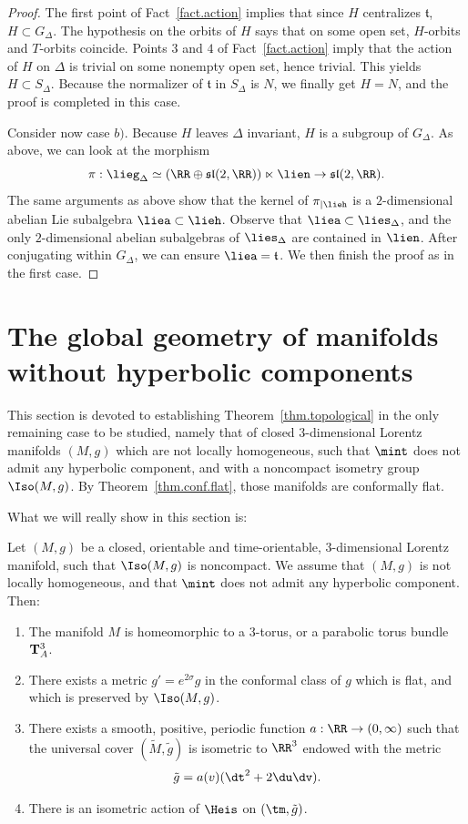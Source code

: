 \begin{proof}
The first point of Fact~\ref{fact.action} implies that since $H$ centralizes $\mathfrak{t}$, $H \subset G_{\Delta}$. The hypothesis on the orbits of $H$ says that on some open set, $H$-orbits and $T$-orbits coincide. Points $3$ and $4$ of Fact~\ref{fact.action} imply that the action of $H$ on $\Delta$ is trivial on some nonempty open set, hence trivial. This yields $H \subset S_{\Delta}$. Because the normalizer of $\mathfrak{t}$ in $S_{\Delta}$ is $N$, we finally get $H=N$, and the proof is completed in this case.



Consider now case $b)$. Because $H$ leaves $\Delta$ invariant, $H$ is a subgroup of $G_{\Delta}$. As above, we can look at the morphism
\[
\pi: \lieg_{\Delta} \simeq (\RR \oplus \mathfrak{sl}(2,\RR)) \ltimes \lien \to \mathfrak{sl}(2,\RR).
\]
The same arguments as above show that the kernel of $\pi_{| \lieh}$ is a $2$-dimensional abelian Lie subalgebra $\liea \subset \lieh$. Observe that $\liea \subset \lies_{\Delta}$, and the only $2$-dimensional abelian subalgebras of $\lies_{\Delta}$ are contained in $\lien$. After conjugating within $G_{\Delta}$, we can ensure $\liea={\mathfrak t}$. We then finish the proof as in the first case.
\end{proof}



\section{The global geometry of manifolds without hyperbolic components}\label{sec.global}
This section is devoted to establishing Theorem~\ref{thm.topological} in the only remaining case to be studied, namely that of closed $3$-dimensional Lorentz manifolds $(M,g)$ which are not locally homogeneous, such that $\mint$ does not admit any hyperbolic component, and with a noncompact isometry group $\Iso(M,g)$. By Theorem~\ref{thm.conf.flat}, those manifolds are conformally flat.

What we will really show in this section is:
\begin{theoreme}\label{th.theoplat}
Let $(M,g)$ be a closed, orientable and time-orientable, $3$-dimensional Lorentz manifold, such that $\Iso(M,g)$ is noncompact. We assume that $(M,g)$ is not locally homogeneous, and that $\mint$ does not admit any hyperbolic component. Then:
\begin{enumerate}
\item \label{8.1.1} The manifold $M$ is homeomorphic to a $3$-torus, or a parabolic torus bundle~${\bf T}_A^3$.
\item \label{8.1.2} There exists a metric $g'=e^{2\sigma}g$ in the conformal class of $g$ which is flat, and which is preserved by $\Iso(M,g)$.
\item \label{8.1.3} There exists a smooth, positive, periodic function $a:\RR \to (0,\infty)$ such that the universal cover $(\tilde{M},{\tilde{g}})$ is isometric to $\RR^3$ endowed with the metric
\[
{\tilde{g}}=a(v)(\dt^2+2\du\dv).
\]
\item \label{8.1.4} There is an isometric action of $\Heis$ on $(\tm,\tilde{g})$.
\end{enumerate}
\end{theoreme}


